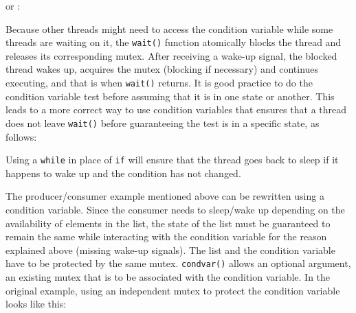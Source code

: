 
or :


Because other threads might need to access the condition variable while some
threads are waiting on it, the \texttt{wait()} function atomically blocks the
thread and releases its corresponding mutex.  After receiving a wake-up signal,
the blocked thread wakes up, acquires the mutex (blocking if necessary) and
continues executing, and that is when \texttt{wait()} returns. It is good
practice to do the condition variable test before assuming that it is in one
state or another. This leads to a more correct way to use condition variables
that ensures that a thread does not leave \texttt{wait()} before guaranteeing
the test is in a specific state, as follows:


Using a \texttt{while} in place of \texttt{if} will ensure that the thread goes
back to sleep if it happens to wake up and the condition has not changed.

The producer/consumer example mentioned above can be rewritten using a condition
variable.  Since the consumer needs to sleep/wake up depending on the
availability of elements in the list, the state of the list must be guaranteed
to remain the same while interacting with the condition variable for the reason
explained above (missing wake-up signals). The list and the condition variable
have to be protected by the same mutex.  \texttt{condvar()} allows an optional
argument, an existing mutex that is to be associated with the condition
variable. In the original example, using an independent mutex to protect the
condition variable looks like this:

